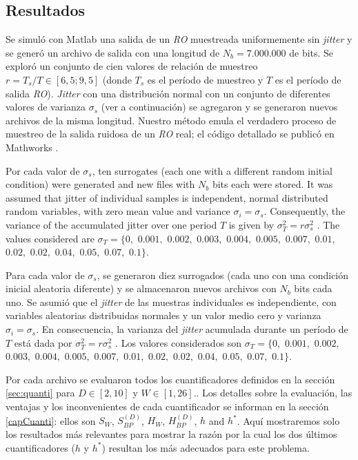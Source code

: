 \subsection{Resultados}
\label{sec:resu}

Se simuló con Matlab\textsuperscript{\textregistered} una salida de un \emph{RO} muestreada uniformemente sin \textit{jitter} y se generó un archivo de salida con una longitud de $N_b = 7.000.000$ de bits.
Se exploró un conjunto de cien valores de relación de muestreo $r = T_s/T \in [6,5; 9,5]$ (donde $T_s$ es el período de muestreo y $T$ es el período de salida \emph{RO}).
\textit{Jitter} con una distribución normal con un conjunto de diferentes valores de varianza $\sigma_s$ (ver a continuación) se agregaron y se generaron nuevos archivos de la misma longitud.
Nuestro método emula el verdadero proceso de muestreo de la salida ruidosa de un \emph{RO} real; el código detallado se publicó en Mathworks \cite{MathworksMaxi}.

Por cada valor de $\sigma_s$, ten surrogates (each one with a different random initial condition) were generated and new files with $N_b$ bits each were stored. It was assumed that jitter of individual samples is independent, normal distributed random variables, with zero mean value and variance $\sigma_i=\sigma_s$. Consequently, the variance of the accumulated jitter over one period $T$ is given by $\sigma^2_T=r \sigma^2_s$ \cite{Valtchanov2008}. The values considered  are $\sigma_T=\{0,$ $0.001,$ $0.002,$ $0.003,$ $0.004,$ $0.005,$ $0.007,$ $0.01,$ $0.02,$ $0.02,$ $0.04,$ $0.05,$ $0.07,$ $0.1\}$.

Para cada valor de $\sigma_s$, se generaron diez surrogados (cada uno con una condición inicial aleatoria diferente) y se almacenaron nuevos archivos con $N_b$ bits cada uno. Se asumió que el \textit{jitter} de las muestras individuales es independiente, con variables aleatorias distribuidas normales y un valor medio cero y varianza $\sigma_i = \sigma_s$.
En consecuencia, la varianza del \textit{jitter} acumulada durante un período de $T$ está dada por $\sigma^2_T = r \sigma^2_s $ \cite{Valtchanov2008}.
Los valores considerados son $\sigma_T=\{0,$ $0.001,$ $0.002,$ $0.003,$ $0.004,$ $0.005,$ $0.007,$ $0.01,$ $0.02,$ $0.02,$ $0.04,$ $0.05,$ $0.07,$ $0.1\}$.

Por cada archivo se evaluaron todos los cuantificadores definidos en la sección \ref{sec:quanti} para $D\in[2,10]$ y $W\in[1,26]$..
Los detalles sobre la evaluación, las ventajas y los inconvenientes de cada cuantificador se informan en la sección \ref{capCuanti}: ellos son $S_W$, $S^{(D)}_{BP}$, $H_{W}$, $H^{(D)}_{BP}$, $h$ and $h^*$. 
Aquí mostraremos solo los resultados más relevantes para mostrar la razón por la cual los dos últimos cuantificadores ($h$ y $h^*$) resultan los más adecuados para este problema.

